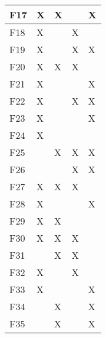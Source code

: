 \documentclass{article}
\begin{document}
\begin{table}[]
\begin{tabular}{|l|l|l|l|l|}
F17                                                               & X      & X   &       & X          \\ \hline
F18                                                               & X      &     & X     &            \\ \hline
F19                                                               & X      &     & X     & X          \\ \hline
F20                                                               & X      & X   & X     &            \\ \hline
F21                                                               & X      &     &       & X          \\ \hline
F22                                                               & X      &     & X     & X          \\ \hline
F23                                                               & X      &     &       & X          \\ \hline
F24                                                               & X      &     &       &            \\ \hline
F25                                                               &        & X   & X     & X          \\ \hline
F26                                                               &        &     & X     & X          \\ \hline
F27                                                               & X      & X   & X     &            \\ \hline
F28                                                               & X      &     &       & X          \\ \hline
F29                                                               & X      & X   &       &            \\ \hline
F30                                                               & X      & X   & X     &            \\ \hline
F31                                                               &        & X   & X     &            \\ \hline
F32                                                               & X      &     & X     &            \\ \hline
F33                                                               & X      &     &       & X          \\ \hline
F34                                                               &        & X   &       & X          \\ \hline
F35                                                               &        & X   &       & X          \\ \hline
\end{tabular}
\end{table}
\end{document}
